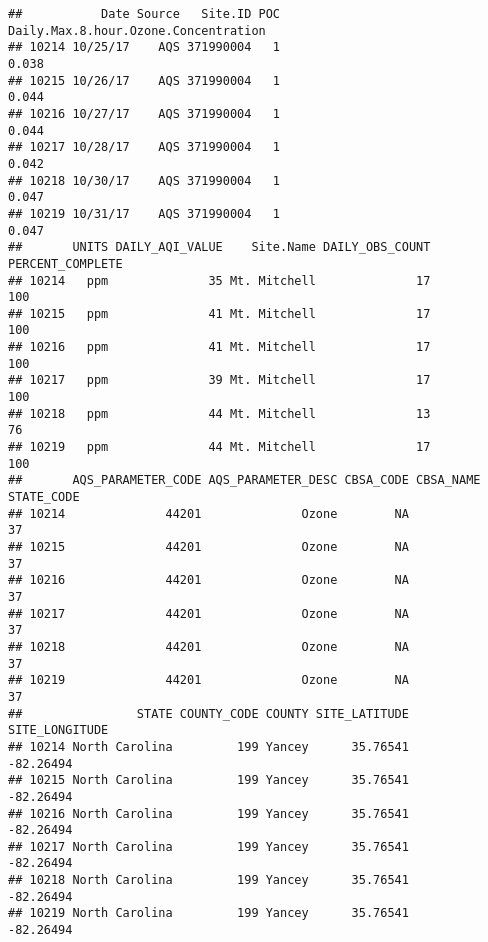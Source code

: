 \documentclass[]{article}
\newenvironment{Shaded}{\begin{snugshade}}{\end{snugshade}}
\newcommand{\KeywordTok}[1]{\textcolor[rgb]{0.13,0.29,0.53}{\textbf{#1}}}
\newcommand{\OperatorTok}[1]{\textcolor[rgb]{0.81,0.36,0.00}{\textbf{#1}}}
\newcommand{\NormalTok}[1]{#1}
\begin{document}
\begin{verbatim}
##           Date Source   Site.ID POC Daily.Max.8.hour.Ozone.Concentration
## 10214 10/25/17    AQS 371990004   1                                0.038
## 10215 10/26/17    AQS 371990004   1                                0.044
## 10216 10/27/17    AQS 371990004   1                                0.044
## 10217 10/28/17    AQS 371990004   1                                0.042
## 10218 10/30/17    AQS 371990004   1                                0.047
## 10219 10/31/17    AQS 371990004   1                                0.047
##       UNITS DAILY_AQI_VALUE    Site.Name DAILY_OBS_COUNT PERCENT_COMPLETE
## 10214   ppm              35 Mt. Mitchell              17              100
## 10215   ppm              41 Mt. Mitchell              17              100
## 10216   ppm              41 Mt. Mitchell              17              100
## 10217   ppm              39 Mt. Mitchell              17              100
## 10218   ppm              44 Mt. Mitchell              13               76
## 10219   ppm              44 Mt. Mitchell              17              100
##       AQS_PARAMETER_CODE AQS_PARAMETER_DESC CBSA_CODE CBSA_NAME STATE_CODE
## 10214              44201              Ozone        NA                   37
## 10215              44201              Ozone        NA                   37
## 10216              44201              Ozone        NA                   37
## 10217              44201              Ozone        NA                   37
## 10218              44201              Ozone        NA                   37
## 10219              44201              Ozone        NA                   37
##                STATE COUNTY_CODE COUNTY SITE_LATITUDE SITE_LONGITUDE
## 10214 North Carolina         199 Yancey      35.76541      -82.26494
## 10215 North Carolina         199 Yancey      35.76541      -82.26494
## 10216 North Carolina         199 Yancey      35.76541      -82.26494
## 10217 North Carolina         199 Yancey      35.76541      -82.26494
## 10218 North Carolina         199 Yancey      35.76541      -82.26494
## 10219 North Carolina         199 Yancey      35.76541      -82.26494
\end{verbatim}

\begin{Shaded}
\end{Shaded}
\end{document}
